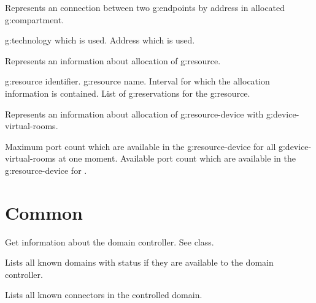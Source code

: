 \begin{Api}
Represents an connection between two \glspl{g:endpoint} by address in allocated \gls{g:compartment}.
\begin{ApiClassAttributes}
 \Gls{g:technology} which is used.
 Address which is used.
\end{ApiClassAttributes}

Represents an information about allocation of \gls{g:resource}.
\begin{ApiClassAttributes}
 \Gls{g:resource} identifier.
 \Gls{g:resource} name.
 Interval for which the allocation information is contained.
 List of \glspl{g:reservation} for the \gls{g:resource}.
\end{ApiClassAttributes}

Represents an information about allocation of \gls{g:resource-device} with \glspl{g:device-virtual-room}.
\begin{ApiClassAttributes}
 Maximum port count which are available in the \Gls{g:resource-device} for all \glspl{g:device-virtual-room} at one moment.
 Available port count which are available in the \Gls{g:resource-device} for .
\end{ApiClassAttributes}


\end{Api}

\section{Common}

\begin{Api}

Get information about the domain controller. See  class.

Lists all known domains with status if they are available to the domain controller.

Lists all known connectors in the controlled domain.

\end{Api}


